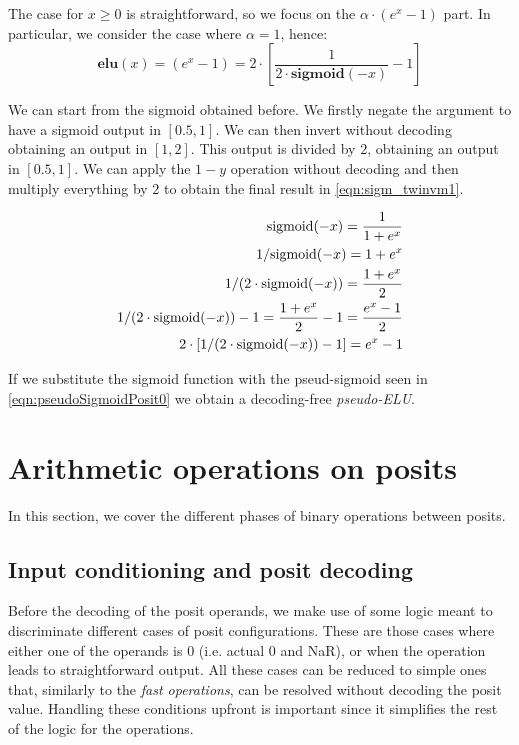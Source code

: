 The case for $x \geq 0$ is straightforward, so we focus on the $\alpha \cdot (e^x - 1)$ part. In particular, we consider the case where $\alpha = 1$, hence:
\begin{equation}
    \mathbf{elu}(x) = (e^x - 1) = 2 \cdot \left [ \frac{1}{2\cdot \mathbf{sigmoid}(-x)} - 1 \right]
\end{equation}

We can start from the sigmoid obtained before. We firstly negate the argument to have a sigmoid output in $[0.5,1]$. We can then invert without decoding obtaining an output in $[1,2]$. This output is divided by $2$, obtaining an output in $[0.5,1]$. We can apply the $1-y$ operation without decoding and then multiply everything by $2$ to obtain the final result in \eqref{eqn:sigm_twinvm1}.

\begin{align}
   \label{eqn:sigm_mx}\textnormal{sigmoid}(-x) = \frac{1}{1+e^{x}}  & \\
   \label{eqn:sigm_invx}1/\textnormal{sigmoid}(-x) = 1+e^x & \\
   \label{eqn:sigm_invtw}1/(2\cdot\textnormal{sigmoid}(-x)) = \frac{1+e^x}{2}& \\
   \label{eqn:sigm_invm1}1/(2\cdot\textnormal{sigmoid}(-x))-1 = \frac{1+e^x}{2} - 1 = \frac{e^x-1}{2} & \\
  \label{eqn:sigm_twinvm1}2\cdot[1/(2\cdot\textnormal{sigmoid}(-x))-1] = e^x -1&
\end{align}

If we substitute the sigmoid function with the pseud-sigmoid seen in \eqref{eqn:pseudoSigmoidPosit0} we obtain a decoding-free \textit{pseudo-ELU}.




\section{Arithmetic operations on posits}\label{sec:posit_ops}

In this section, we cover the different phases of binary operations between posits.

\subsection{Input conditioning and posit decoding}\label{input_conditioning_section}

Before the decoding of the posit operands, we make use of some logic meant to discriminate different cases of posit configurations. These are those cases where either one of the operands is $0$ (i.e. actual $0$ and NaR), or when the operation leads to straightforward output. All these cases can be reduced to simple ones that, similarly to the \textit{fast operations}, can be resolved without decoding the posit value. Handling these conditions upfront is important since it simplifies the rest of the logic for the operations.

